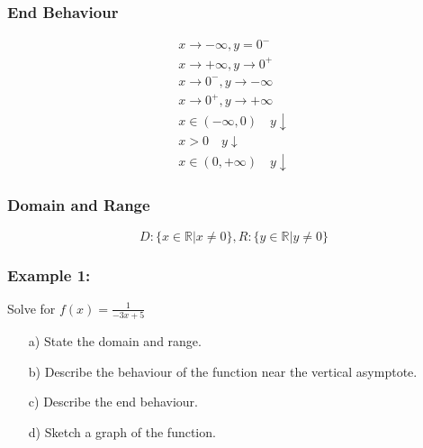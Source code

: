 \documentclass{article}
\begin{document}
\subsubsection{End Behaviour}
\begin{align*}
    x \to -\infty, y=0^-\\
    x \to +\infty, y\to 0^+\\
    x \to 0^-, y \to-\infty\\
    x\to 0^+, y\to+\infty\\
    x\in (-\infty,0) \quad y \downarrow \\
    x > 0 \quad  y \downarrow \\
    x \in (0, +\infty) \quad y \downarrow 
\end{align*}

\subsubsection{Domain and Range}
\begin{equation*}
    D: \{x \in \mathbb{R} | x \neq 0\}, 
    R: \{y \in \mathbb{R} | y \neq 0\} 
\end{equation*}
\subsubsection*{Example 1:}
Solve for $f(x)=\frac{1}{-3x+5}$
\begin{enumerate}
\item[a)] State the domain and range.
\item[b)] Describe the behaviour of the function near the vertical asymptote.
\item[c)] Describe the end behaviour.
\item[d)] Sketch a graph of the function.
\end{enumerate}
\end{document}
